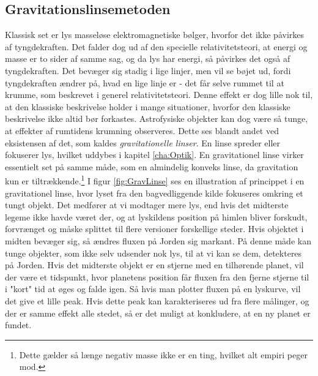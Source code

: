 \subsection*{Gravitationslinsemetoden} \label{sec:GravLinse}
Klassisk set er lys masseløse elektromagnetiske bølger, hvorfor det ikke påvirkes af tyngdekraften. Det falder dog ud af den specielle relativitetsteori, at energi og masse er to sider af samme sag, og da lys har energi, så påvirkes det også af tyngdekraften. Det bevæger sig stadig i lige linjer, men vil se bøjet ud, fordi tyngdekraften ændrer på, hvad en lige linje er - det får selve rummet til at krumme, som beskrevet i generel relativitetsteori. Denne effekt er dog lille nok til, at den klassiske beskrivelse holder i mange situationer, hvorfor den klassiske beskrivelse ikke altid bør forkastes. Astrofysiske objekter kan dog være så tunge, at effekter af rumtidens krumning observeres. Dette ses blandt andet ved eksistensen af det, som kaldes \textit{gravitationelle linser}. En linse spreder eller fokuserer lys, hvilket uddybes i kapitel \ref{cha:Optik}. En gravitationel linse virker essentielt set på samme måde, som en almindelig konveks linse, da gravitation kun er tiltrækkende.\footnote{Dette gælder så længe negativ masse ikke er en ting, hvilket alt empiri peger mod.} I figur \ref{fig:GravLinse} ses en illustration af princippet i en gravitationel linse, hvor lyset fra den bagvedliggende kilde fokuseres omkring et tungt objekt. Det medfører at vi modtager mere lys, end hvis det midterste legeme ikke havde været der, og at lyskildens position på himlen bliver forskudt, forvrænget og måske splittet til flere versioner forskellige steder. Hvis objektet i midten bevæger sig, så ændres fluxen på Jorden sig markant. På denne måde kan tunge objekter, som ikke selv udsender nok lys, til at vi kan se dem, detekteres på Jorden. Hvis det midterste objekt er en stjerne med en tilhørende planet, vil der være et tidspunkt, hvor planetens position får fluxen fra den fjerne stjerne til i "kort"  tid at øges og falde igen. Så hvis man plotter fluxen på en lyskurve, vil det give et lille peak. Hvis dette peak kan karakteriseres ud fra flere målinger, og der er samme effekt alle stedet, så er det muligt at konkludere, at en ny planet er fundet. \\

